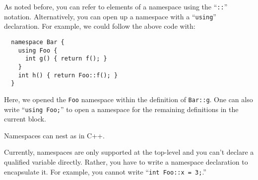 As noted before, you can refer to elements of a namespace using the
``\texttt{::}'' notation.  Alternatively, you can open up a namespace
with a ``\texttt{using}'' declaration.  For example, we could follow the
above code with:
\begin{verbatim}
  namespace Bar {  
    using Foo { 
      int g() { return f(); } 
    } 
    int h() { return Foo::f(); } 
  }
\end{verbatim}

Here, we opened the \texttt{Foo} namespace within the definition of
\texttt{Bar::g}.  One can also write ``\texttt{using Foo;}'' to open a
namespace for the remaining definitions in the current block.

Namespaces can nest as in C++.  

Currently, namespaces are only supported at the top-level and you
can't declare a qualified variable directly.  Rather, you have to
write a namespace declaration to encapsulate it.  For example, you
cannot write ``\texttt{int Foo::x = 3;}.''


